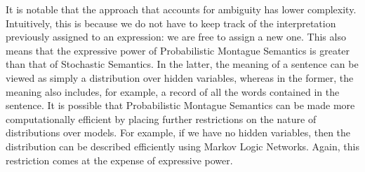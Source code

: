 \documentclass[manuscript]{clv2}
\begin{document}
It is notable that the approach that accounts for ambiguity has lower
complexity.
Intuitively, this is because we
do not have to keep track of the interpretation previously assigned to
an expression: we are free to assign a new one. This also means that the expressive power of Probabilistic Montague
Semantics is greater than that of Stochastic Semantics. In the latter, the
meaning of a sentence can be viewed as simply a distribution over
hidden variables, whereas in the former, the meaning also
includes, for example, a record of all the words contained in the
sentence.
It is possible that Probabilistic Montague Semantics can be made more
computationally efficient by placing further restrictions on the
nature of distributions over models. For example, if we have no hidden
variables, then the distribution
can be described efficiently using Markov Logic Networks. Again, this
restriction comes at the expense of expressive power.





\end{document}
